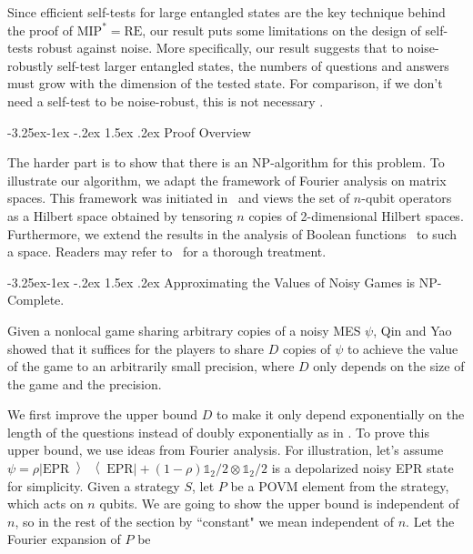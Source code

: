 \documentclass[11pt]{article}
\makeatletter
\renewcommand{\subsection}{\@startsection{subsection}{2}{\z@}%
             {-3.25ex\@plus -1ex \@minus -.2ex}%
             {1.5ex \@plus .2ex}%
             {\normalfont\large\scshape\bfseries}}
\renewcommand{\subsubsection}{\@startsection{subsubsection}{2}{\z@}%
             {-3.25ex\@plus -1ex \@minus -.2ex}%
             {1.5ex \@plus .2ex}%
             {\normalfont\normalsize\scshape\bfseries}}
\theoremstyle{plain}
\theoremstyle{definition}
\newcommand {\ketbratwo} [2] {\ensuremath{ \left| #1 \middle\rangle \middle\langle #2 \right| }}
\newcommand {\ketbra} [1] {\ketbratwo{#1}{#1}}
\newcommand {\id} {\ensuremath{\mathds{1}}}
\newcommand{\1}{\mathbb{1}} %
\newcommand{\MIP}{\mathrm{MIP}}
\newcommand{\RE}{\mathrm{RE}}
\newcommand{\NP}{\mathrm{NP}}
\makeatother
\begin{document}
Since efficient self-tests for large entangled states are the key technique behind the proof of $\MIP^* = \RE$, our result puts some limitations on the design of self-tests robust against noise. 
More specifically, our result suggests that to noise-robustly self-test larger entangled states, the numbers of questions and answers must grow with the dimension of the tested state.
For comparison, if we don't need a self-test to be noise-robust, this is not necessary \cite{fu2019}. 


%
\subsection{Proof Overview}

The harder part is to show that there is an $\NP$-algorithm for this problem. 
To illustrate our algorithm, we adapt the framework of Fourier analysis on matrix spaces. This framework was initiated in~\cite{MO10,PhysRevA.84.052328} and views the set of $n$-qubit operators as a Hilbert space obtained by tensoring $n$ copies of 2-dimensional Hilbert spaces. Furthermore, we extend the results in the analysis of Boolean functions~\cite{Odonnell08} to such a space.
Readers may refer to~\cite{qin2021nonlocal} for a thorough treatment.

\subsubsection{Approximating the Values of Noisy Games is \texorpdfstring{$\NP$}{NP}-Complete.}  


Given a nonlocal game sharing arbitrary copies of a noisy MES $\psi$, 
 Qin and Yao \cite{qin2021nonlocal} showed that
it suffices for the players to share
 $D$ copies of $\psi$ to achieve the value of the game to an arbitrarily small precision, where $D$ only depends on the size of the game and the precision.

We first improve the upper bound $D$ to make it only depend exponentially on the length of the questions instead of doubly exponentially as in \cite{qin2021nonlocal}.
To prove this upper bound, we use ideas from Fourier analysis. For illustration, 
let's assume $\psi=\rho\ketbra{\mathrm{EPR}}+(1-\rho)\id_2/2\otimes\id_2/2$ is a depolarized noisy EPR state for simplicity. 
 Given a strategy $S$, let $P$ be a POVM element from the strategy, which acts on $n$ qubits.
 We are going to show the upper bound is independent of $n$, so in the rest of the section by ``constant" we mean independent of $n$.
 Let the Fourier expansion of $P$ be
\end{document}
